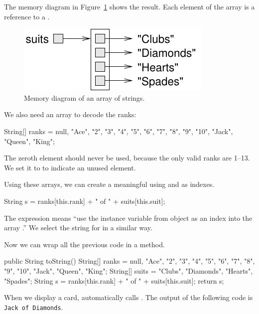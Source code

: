 The memory diagram in Figure~\ref{fig.stringarray} shows the result.
Each element of the array is a reference to a .

\begin{figure}[!ht]
\begin{center}
\includegraphics{figs/stringarray.pdf}
\caption{Memory diagram of an array of strings.}
\label{fig.stringarray}
\end{center}
\end{figure}

We also need an array to decode the ranks:

\begin{code}
String[] ranks = {null, "Ace", "2", "3", "4", "5", "6",
           "7", "8", "9", "10", "Jack", "Queen", "King"};
\end{code}

The zeroth element should never be used, because the only valid ranks are 1--13.
We set it to  to indicate an unused element.

Using these arrays, we can create a meaningful  using  and  as indexes.

\begin{code}
String s = ranks[this.rank] + " of " + suits[this.suit];
\end{code}

The expression  means ``use the instance variable  from  object as an index into the array .''
We select the string for  in a similar way.

Now we can wrap all the previous code in a  method.

\begin{code}
public String toString() {
    String[] ranks = {null, "Ace", "2", "3", "4", "5", "6",
               "7", "8", "9", "10", "Jack", "Queen", "King"};
    String[] suits = {"Clubs", "Diamonds", "Hearts", "Spades"};
    String s = ranks[this.rank] + " of " + suits[this.suit];
    return s;
}
\end{code}

When we display a card,  automatically calls .
The output of the following code is {\tt Jack of Diamonds}.

